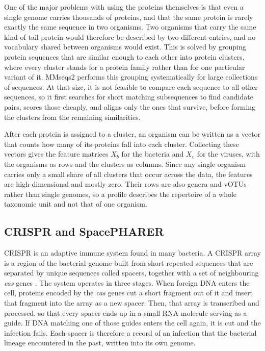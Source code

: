 One of the major problems with using the proteins themselves is that even a single genome carries thousands of proteins,
and that the same protein is rarely exactly the same sequence in two organisms. Two organisms that carry the same kind of 
tail protein would therefore be described by two different entries, and no vocabulary shared between organisms 
would exist. This is solved by grouping protein sequences that are similar enough to each other into protein 
clusters, where every cluster stands for a protein family rather than for one particular variant of it. MMseqs2 \citep{steinegger2017} 
performs this grouping systematically for large collections of sequences. At that size, 
it is not feasible to compare each sequence to all other sequences, so it first searches for short matching subsequences to 
find candidate pairs, scores those cheaply, and aligns only the ones that survive, before forming the clusters 
from the remaining similarities.

After each protein is assigned to a cluster, an organism can be written as a vector that counts how many of
its proteins fall into each cluster. Collecting these vectors gives the feature matrices $X_b$ for the
bacteria and $X_v$ for the viruses, with the organisms as rows and the clusters as columns. Since any single organism
carries only a small share of all clusters that occur across the data, the features are high-dimensional and mostly zero.
Their rows are also genera and vOTUs rather than single genomes, so a profile describes the 
repertoire of a whole taxonomic unit and not that of one organism.

\subsection{CRISPR and SpacePHARER}
CRISPR is an adaptive immune system found in many bacteria. A CRISPR array is a region of the bacterial 
genome built from short repeated sequences that are separated by unique sequences called spacers, together with 
a set of neighbouring \textit{cas} genes \citep{hille2018}. The system operates in three stages. When foreign
DNA enters the cell, proteins encoded by the \textit{cas} genes cut a short fragment out of it and insert that fragment 
into the array as a new spacer. Then, that array is transcribed and processed, so that every spacer ends up in a 
small RNA molecule serving as a guide. If DNA matching one of those guides enters the cell again, it is cut 
and the infection fails. Each spacer is therefore a record of an infection that the bacterial lineage 
encountered in the past, written into its own genome.


